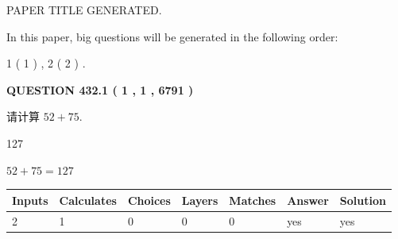 \documentclass{ctexart}
\begin{document}
   
 \vspace{0.2in}
 
 
 
 
   
   
 PAPER TITLE GENERATED.
   
   
   
\vspace{0.2in}
   
In this paper, big questions will be generated in the following order: 
   
   
   1 ( 1 )
 ,
   2 ( 2 )
 .
  
\vspace{0.2in}
  
{\textbf{\Large{QUESTION
432.1 
 ( 1 , 1 , 6791 )
}}}
  
  
 
请计算 $ %
52 +  %
75 $.
 
 
 
\noindent{}
 
 

127
 
 
\noindent{}
 
 

 
 
 
\noindent{}
 
 

$ %
52 +  %
75=   %
127$
 
 
\noindent{}
 
 

 
   
   
   
   
\noindent\begin{tabular}{|l|l|l|l|l|l|l|}
 \hline
Inputs & Calculates & Choices & Layers & Matches & Answer & Solution \\ \hline
 2  & 
 1  & 
 0
  & 
 0  & 
 0  & 
  yes & 
  yes 
  \\ \hline
 \end{tabular}
   
   
   
   
\noindent{}
   
   
  
\end{document}

